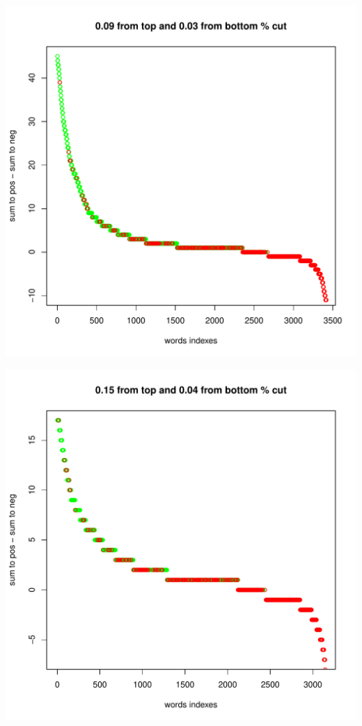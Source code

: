 \documentclass[11pt]{article}\usepackage[]{graphicx}\usepackage[]{color}
\makeatletter
\def\maxwidth{ %
  \ifdim\Gin@nat@width>\linewidth
    \linewidth
  \else
    \Gin@nat@width
  \fi
}
\newenvironment{knitrout}{}{} %
\makeatother
\begin{document}
\begin{knitrout}
\includegraphics[width=\maxwidth]{figure/unnamed-chunk-73} 

\includegraphics[width=\maxwidth]{figure/unnamed-chunk-74} 

\end{knitrout}
\end{document}
